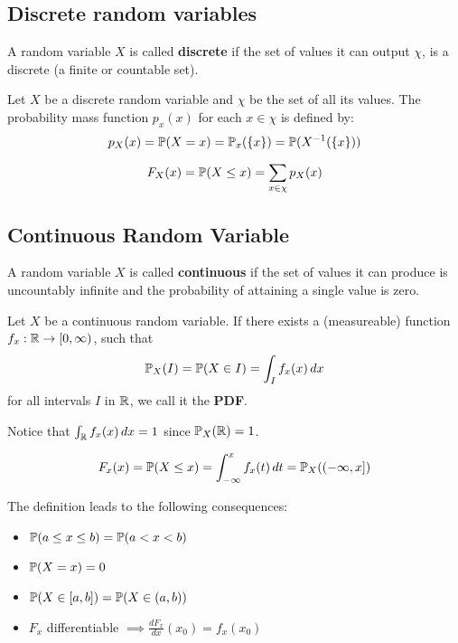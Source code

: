 \subsection{Discrete random variables}
A random variable \(X\) is called \textbf{discrete} if the set of values it can output \(\chi\), is a discrete (a finite or countable set).

\begin{ddefinition*}
  Let \(X\) be a discrete random variable and \(\chi\) be the set of all its values. The probability mass function \(p_x(x)\) for each \(x \in \chi\) is defined by:
  \[p_X(x) = \P(X = x) = \P_x(\{x\}) = \P(X^{-1}(\{x\}))\]
\end{ddefinition*}

\begin{ddefinition*}
  \[F_X(x) = \P(X \leq x) = \sum_{x \in \chi} p_X(x)\]
\end{ddefinition*}

\subsection{Continuous Random Variable}
A random variable \(X\) is called \textbf{continuous} if the set of values it can produce is uncountably infinite and the probability of attaining a single value is zero.

\begin{cdefinition*}
  Let \(X\) be a continuous random variable. If there exists a (measureable) function \(f_x: \R \to [0, \infty)\), such that
  \[\P_X(I) = \P(X \in I) = \int_I f_x(x) \,dx\]
  for all intervals \(I\) in \(\R\), we call it the \textbf{PDF}.
\end{cdefinition*}

Notice that \(\int_\R f_x(x) \, dx = 1\) since \(\P_X(\R) = 1\).

\begin{cdefinition*}
  \[F_x(x) = \P(X \leq x) = \int_{-\infty}^x f_x(t) \,dt = \P_X((-\infty, x])\]
\end{cdefinition*}
The definition leads to the following consequences:
\begin{itemize}
  \item \(\P(a \leq x \leq b) = \P(a < x < b)\)
  \item \(\P(X = x) = 0\)
  \item \(\P(X \in [a, b]) = \P(X \in (a, b))\)
  \item \(F_x\) differentiable \(\implies \frac{dF_x}{dx}(x_0) = f_x(x_0)\)
\end{itemize}
